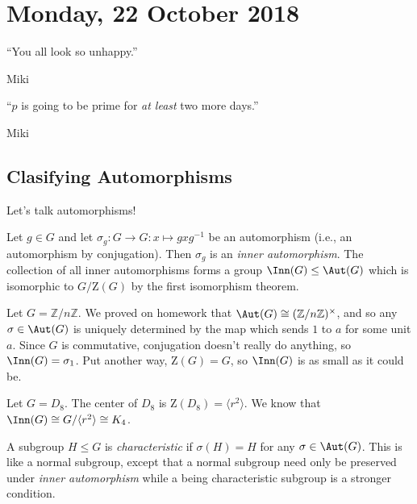 \section{Monday, 22 October 2018}

\epigraph{``You all look so unhappy.''}{Miki}
\epigraph{``$p$ is going to be prime for \emph{at least} two more days.''}{Miki}

\subsection{Clasifying Automorphisms}

Let's talk automorphisms!

\begin{definition}
Let $g \in G$ and let $\sigma_g : G \to G : x \mapsto gxg^{-1}$ be an automorphism (i.e., an automorphism by conjugation). Then $\sigma_g$ is an \emph{inner automorphism}. The collection of all inner automorphisms forms a group $\Inn(G) \leq \Aut(G)$ which is isomorphic to $G/\mathrm{Z}(G)$ by the first isomorphism theorem.
\end{definition}

\begin{example}
Let $G = \mathbb{Z}/n\mathbb{Z}$. We proved on homework that $\Aut(G) \cong (\mathbb{Z}/n\mathbb{Z})^\times$, and so any $\sigma \in \Aut(G)$ is uniquely determined by the map which sends $1$ to $a$ for some unit $a$. Since $G$ is commutative, conjugation doesn't really do anything, so $\Inn(G) = \sigma_1$. Put another way, $\mathrm{Z}(G) = G$, so $\Inn(G)$ is as small as it could be.
\end{example}

\begin{example}
Let $G = D_8$. The center of $D_8$ is $\mathrm{Z}(D_8) = \langle r^2 \rangle$. We know that $\Inn(G) \cong G/\langle r^2 \rangle \cong K_4$.
\end{example}

\begin{definition}[Characteristic]
A subgroup $H \leq G$ is \emph{characteristic} if $\sigma(H) = H$ for any $\sigma \in \Aut(G)$. This is like a normal subgroup, except that a normal subgroup need only be preserved under \emph{inner automorphism} while a being characteristic subgroup is a stronger condition.
\end{definition}

